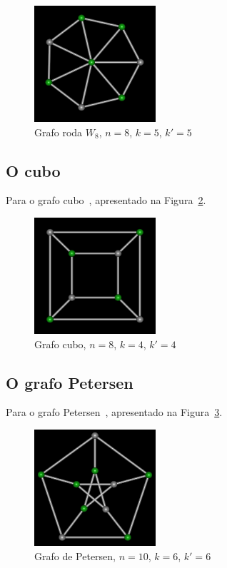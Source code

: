 \begin{figure}[htb]
\centering
\includegraphics[width=0.4\textwidth]{img/wheel.png}
\caption{Grafo roda $W_8$, $n=8$, $k=5$, $k'=5$}
\label{fig:example-wheel}
\end{figure}


\subsection{O cubo}
Para o grafo cubo~\cite{cite:example-plato},
apresentado na Figura~\ref{fig:example-cube}.

\begin{figure}[htb]
\centering
\includegraphics[width=0.4\textwidth]{img/cube.png}
\caption{Grafo cubo, $n=8$, $k=4$, $k'=4$}
\label{fig:example-cube}
\end{figure}


\subsection{O grafo Petersen}
Para o grafo Petersen~\cite{cite:example-petersen},
apresentado na Figura~\ref{fig:example-petersen}.

\begin{figure}[htb]
\centering
\includegraphics[width=0.4\textwidth]{img/petersen.png}
\caption{Grafo de Petersen, $n=10$, $k=6$, $k'=6$}
\label{fig:example-petersen}
\end{figure}


